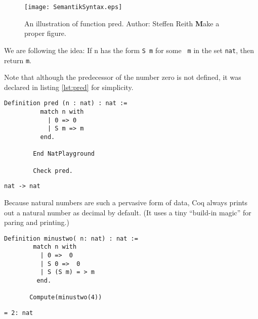 	   \begin{figure}[p]
	   	\texttt{[image: SemantikSyntax.eps]}
	   	\caption{An illustration of function pred. Author: Steffen Reith {\textbf Make a proper figure.}}
	   	\label{fig:SemantikAndSyntaxPred}	     
	   \end{figure}	  
	   

	\begin{figure}
		\centering
		\def\svgwidth{\columnwidth}
		
	\end{figure}	   
	     

	  We are following the idea:  If n has the form \lstinline!S m! for some \lstinline! m! in the set \lstinline!nat!, then return  \lstinline!m!.
	  \begin{example}%
	   {\normalfont 
	   Note that although the predecessor of the number zero is not defined, it was declared in listing \ref{lst:pred} for simplicity.    

	   
	   \begin{minipage}[t]{0.45\textwidth}
	   \begin{lstlisting}[caption= \lstinline!pred!, label =lst:pred]
	  	Definition pred (n : nat) : nat := 
	  	  match n with 
	   	    | 0 => 0
	   	    | S m => m
	   	  end. 
	   	  
	    End NatPlayground
	   	 
	    Check pred. 
	    \end{lstlisting}
	    \end{minipage}
	    \hfill
	    \begin{minipage}[t]{0.45\textwidth}
	    \begin{lstlisting}[caption= Coq-output]
	     nat -> nat    
	    \end{lstlisting}
	    \end{minipage}
	   
	    
	  \normalfont }
	  \end{example}
	  
	  Because natural numbers are such a pervasive form of data, Coq always prints out a natural number as decimal by default.
	  (It uses a tiny ``build-in magic'' for paring and printing.)
	 
	  \begin{minipage}[t]{0.50\textwidth}
	  \begin{lstlisting}[caption= \lstinline! minustwo!]
	   Definition minustwo( n: nat) : nat :=
	    match n with
	      | 0 =>  0
	      | S 0 =>  0
	      | S (S m) = > m
	     end.
	     
	   Compute(minustwo(4))
	   \end{lstlisting} 
	   \end{minipage} 
	   \hfill     
	  \begin{minipage}[t]{0.45\textwidth}
	  \begin{lstlisting}[caption = Coq-output] 
	    = 2: nat 
	   \end{lstlisting}
	   \end{minipage}     
	      
